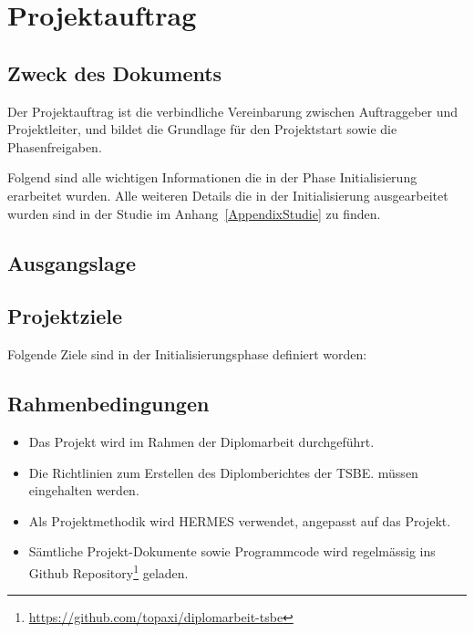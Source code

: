 \chapter{Projektauftrag}

\label{AppendixProjektauftrag}

\section{Zweck des Dokuments}\label{ProjektauftragZweck}

Der Projektauftrag ist die verbindliche Vereinbarung zwischen Auftraggeber und
Projektleiter, und bildet die Grundlage für den Projektstart sowie die
Phasenfreigaben.

Folgend sind alle wichtigen Informationen die in der Phase Initialisierung
erarbeitet wurden. Alle weiteren Details die in der Initialisierung
ausgearbeitet wurden sind in der Studie im Anhang~\ref{AppendixStudie} zu
finden.

\section{Ausgangslage}\label{ausgangslage}



\clearpage
\section{Projektziele}\label{projektziele}

Folgende Ziele sind in der Initialisierungsphase definiert worden:



\section{Rahmenbedingungen}\label{rahmenbedingungen}

\begin{itemize}
  \tightlist
  \item{}
    Das Projekt wird im Rahmen der Diplomarbeit durchgeführt.
  \item{}
    Die Richtlinien zum Erstellen des Diplomberichtes der TSBE.
    müssen eingehalten werden.
  \item{}
    Als Projektmethodik wird HERMES verwendet, angepasst auf das Projekt.
  \item{}
    Sämtliche Projekt-Dokumente sowie Programmcode wird regelmässig ins Github
    Repository\footnote{\url{https://github.com/topaxi/diplomarbeit-tsbe}} geladen.
\end{itemize}


